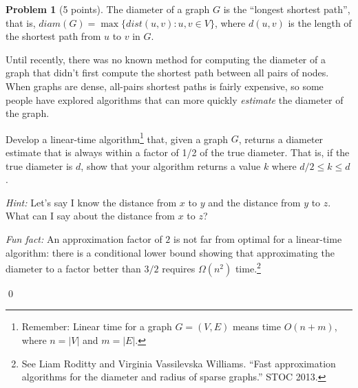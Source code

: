 \documentclass[12pt]{article}
\theoremstyle{definition}
\newtheorem{question}{Problem}
\newenvironment{solution}{\bigskip\noindent{\em Solution.}  \ignorespaces}{\hfill\qed}
\begin{document}
\begin{question}[5 points]
The diameter of a graph $G$ is the ``longest shortest path'', that is, $diam(G) = \max\{dist(u,v) : u,v \in V\}$, where $d(u,v)$ is the length of the shortest path from $u$ to $v$ in $G$.

Until recently, there was no known method for computing the diameter of a graph that didn't first compute the shortest path between all pairs of nodes.  When graphs are dense, all-pairs shortest paths is fairly expensive, so some people have explored algorithms that can more quickly {\em estimate} the diameter of the graph.  

Develop a linear-time algorithm\footnote{Remember: Linear time for a graph $G = (V,E)$ means time
$O(n + m)$, where $n = |V|$ and $m =|E|$.}
that, given a graph $G$, returns a diameter estimate that is always within a factor of 1/2 of the true diameter.  That is, if the true diameter is $d$, show that your algorithm returns a value $k$ where $d/2 \leq k \leq d$.

\bigskip
\textit{Hint:}  Let's say I know the distance from $x$ to $y$ and the distance from $y$ to $z$.  What can I say about the distance from $x$ to $z$?  

\bigskip

\textit{Fun fact:} An approximation factor of $2$ is not far from optimal for a linear-time algorithm: there is a conditional lower bound showing that approximating the diameter to a factor better than $3/2$ requires $\Omega(n^2)$ time.\footnote{See Liam Roditty and Virginia Vassilevska Williams.  ``Fast approximation algorithms for the  diameter  and  radius  of  sparse  graphs.'' STOC 2013.}
\end{question}

\begin{solution}

  
\end{solution}
\newpage
\end{document}
